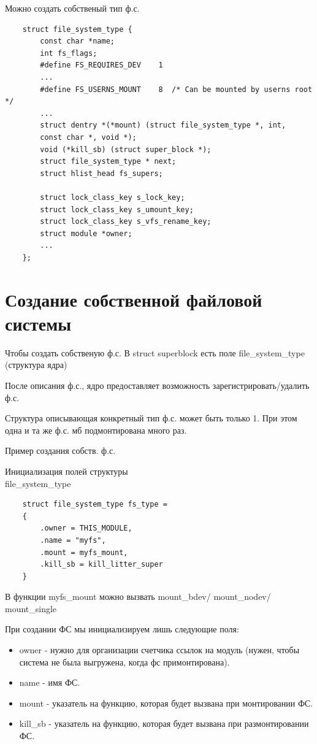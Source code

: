 Можно создать собственый тип ф.с.
\begin{lstlisting}
	struct file_system_type {
		const char *name;
		int fs_flags;
		#define FS_REQUIRES_DEV    1 
		...
		#define FS_USERNS_MOUNT    8  /* Can be mounted by userns root */
		...
		struct dentry *(*mount) (struct file_system_type *, int,
		const char *, void *);
		void (*kill_sb) (struct super_block *);
		struct file_system_type * next;
		struct hlist_head fs_supers;
		
		struct lock_class_key s_lock_key;
		struct lock_class_key s_umount_key;
		struct lock_class_key s_vfs_rename_key;
		struct module *owner;
		...
	};
\end{lstlisting}


\section{Создание собственной файловой системы}

Чтобы создать собственую ф.с. В struct superblock есть поле file\_system\_type (структура ядра)

После описания ф.с., ядро предоставляет возможность зарегистрировать/удалить ф.с.

Структура описывающая конкретный тип ф.с. может быть только 1. При этом одна и та же ф.с. мб подмонтирована много раз.

Пример создания собств. ф.с.

Инициализация полей структуры \\ file\_system\_type
\begin{lstlisting}
	struct file_system_type fs_type =
	{
		.owner = THIS_MODULE,
		.name = "myfs",
		.mount = myfs_mount,
		.kill_sb = kill_litter_super
	}
\end{lstlisting}

В функции myfs\_mount можно вызвать mount\_bdev/ mount\_nodev/ \\ mount\_single

При создании ФС мы инициализируем лишь следующие поля:

\begin{itemize}[label=---]
	\item owner - нужно для организации счетчика ссылок на модуль (нужен, чтобы система не была выгружена, когда фс примонтирована).
	\item name - имя ФС.
	\item  mount - указатель на функцию, которая будет вызвана при монтировании ФС.
	\item kill\_sb - указатель на функцию, которая будет вызвана при размонтировании ФС.
\end{itemize}

